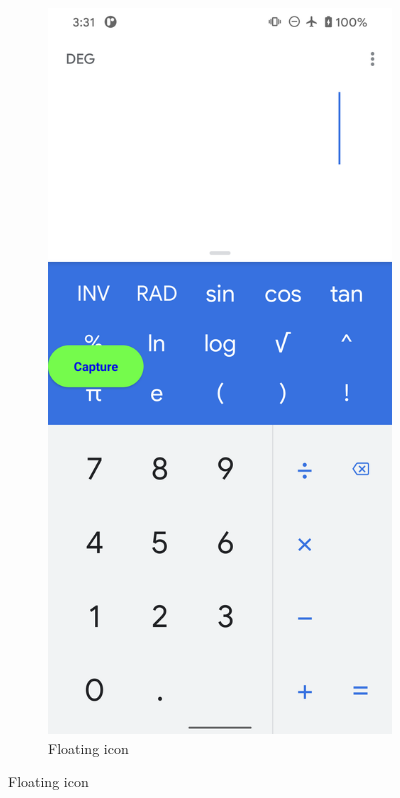 \begin{figure}[tp]
\begin{subfigure}[]{0.30\columnwidth}
		\includegraphics[width=\textwidth]{figure/001_app_capture.png}
		\caption{Floating icon}
		\label{fig:tool1_screenshot_a}

\end{subfigure}
\end{figure}
